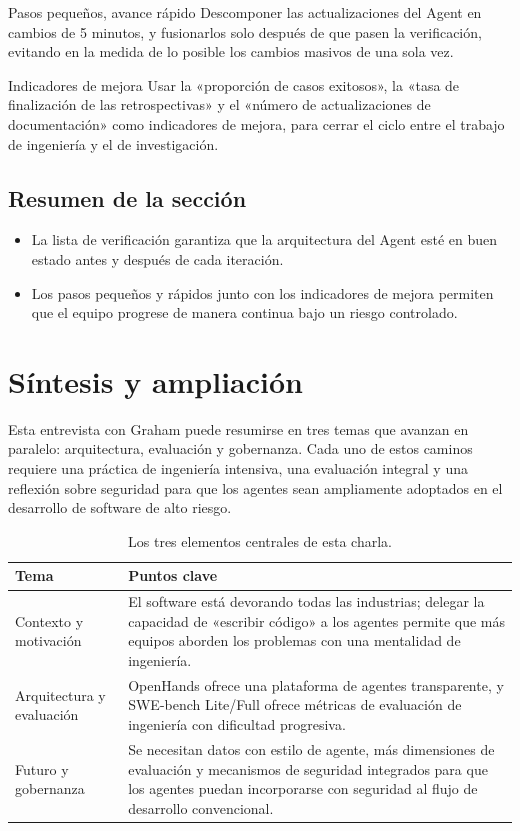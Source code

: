 \documentclass[a4paper]{article}
\begin{document}
\begin{importantbox}{Pasos pequeños, avance rápido}
Descomponer las actualizaciones del Agent en cambios de 5 minutos, y fusionarlos solo después de que pasen la verificación, evitando en la medida de lo posible los cambios masivos de una sola vez.
\end{importantbox}

\begin{knowledgebox}{Indicadores de mejora}
Usar la «proporción de casos exitosos», la «tasa de finalización de las retrospectivas» y el «número de actualizaciones de documentación» como indicadores de mejora, para cerrar el ciclo entre el trabajo de ingeniería y el de investigación.
\end{knowledgebox}

\subsection{Resumen de la sección}
\begin{itemize}
    \item La lista de verificación garantiza que la arquitectura del Agent esté en buen estado antes y después de cada iteración.
    \item Los pasos pequeños y rápidos junto con los indicadores de mejora permiten que el equipo progrese de manera continua bajo un riesgo controlado.
\end{itemize}

\section{Síntesis y ampliación}
Esta entrevista con Graham puede resumirse en tres temas que avanzan en paralelo: arquitectura, evaluación y gobernanza. Cada uno de estos caminos requiere una práctica de ingeniería intensiva, una evaluación integral y una reflexión sobre seguridad para que los agentes sean ampliamente adoptados en el desarrollo de software de alto riesgo.

\begin{table}[H]
\centering
\begin{tabular}{p{} p{}}
\toprule
Tema & Puntos clave \\
\midrule
Contexto y motivación & El software está devorando todas las industrias; delegar la capacidad de «escribir código» a los agentes permite que más equipos aborden los problemas con una mentalidad de ingeniería. \\
\midrule
Arquitectura y evaluación & OpenHands ofrece una plataforma de agentes transparente, y SWE-bench Lite/Full ofrece métricas de evaluación de ingeniería con dificultad progresiva. \\
\midrule
Futuro y gobernanza & Se necesitan datos con estilo de agente, más dimensiones de evaluación y mecanismos de seguridad integrados para que los agentes puedan incorporarse con seguridad al flujo de desarrollo convencional. \\
\bottomrule
\end{tabular}
\caption{Los tres elementos centrales de esta charla.}
\end{table}
\end{document}
